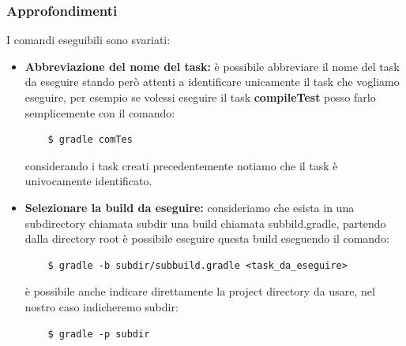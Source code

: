 \documentclass{article}
\begin{document}
\begin{flushleft}
\subsubsection{Approfondimenti}
I comandi eseguibili sono svariati:
\begin{itemize}
    \item \textbf{Abbreviazione del nome del task:} è possibile abbreviare il nome del task da eseguire stando però attenti a identificare unicamente il task che vogliamo eseguire, per esempio se volessi eseguire il task \textbf{compileTest} posso farlo semplicemente con il comando:
    \begin{verbatim}
    $ gradle comTes
    \end{verbatim}
    considerando i task creati precedentemente notiamo che il task è univocamente identificato.
    \item \textbf{Selezionare la build da eseguire:} consideriamo che esista in una subdirectory chiamata subdir una build chiamata subbild.gradle, partendo dalla directory root è possibile eseguire questa build eseguendo il comando:
    \begin{verbatim}
    $ gradle -b subdir/subbuild.gradle <task_da_eseguire>
    \end{verbatim}
    è possibile anche indicare direttamente la project directory da usare, nel nostro caso indicheremo subdir:
    \begin{verbatim}
    $ gradle -p subdir
    \end{verbatim}
\end{itemize}


\end{flushleft}
\end{document}
